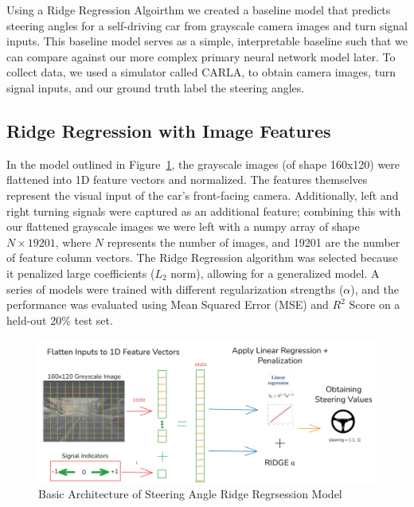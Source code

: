 \documentclass{article} %
\begin{document}
Using a Ridge Regression Algoirthm we created a baseline model that predicts steering angles for a self-driving car 
from grayscale camera images and turn signal inputs. This baseline model serves as a simple, interpretable baseline
such that we can compare against our more complex primary neural network model later. To collect data, we used a simulator
called CARLA, to obtain camera images, turn signal inputs, and our ground truth label the steering angles.


\subsection{Ridge Regression with Image Features}

In the model outlined in Figure~\ref{fig:diagram}, the grayscale images (of shape 160x120) were flattened into 1D feature vectors and normalized. The features themselves
represent the visual input of the car's front-facing camera. Additionally, left and right turning signals were captured as an
additional feature; combining this with our flattened grayscale images we were left with a numpy array of shape $N \times 19201$,
where $N$ represents the number of images, and 19201 are the number of feature column vectors. The Ridge Regression algorithm was
selected because it penalized large coefficients ($L_2$ norm), allowing for a generalized model. A series of models were trained
with different regularization strengths ($\alpha$), and the performance was evaluated using Mean Squared Error (MSE) and $R^2$ Score
on a held-out 20\% test set. 

\begin{figure}[H] %
    \centering
    \includegraphics[width=1.0\textwidth]{diagram.png} %
    \caption{Basic Architecture of Steering Angle Ridge Regrsession Model}
    \label{fig:diagram}
\end{figure}
\end{document}
